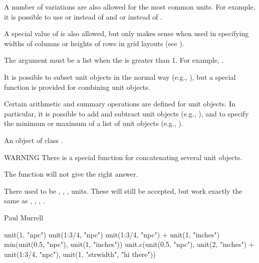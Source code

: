 \begin{Details}
\begin{description}
\end{description}


A number of variations are also allowed for the most common units.
For example, it is possible to use  or 
instead of  and  or
 instead of .

A special  value of  is also allowed,
but only makes sense when used in specifying widths of columns
or heights of rows in grid layouts (see ).

The  argument must be a list when the 
is greater than 1.  For example,
.

It is possible to subset unit objects in the normal way
(e.g., ), but a special function
 is provided for combining unit objects.

Certain arithmetic and summary operations are defined for
unit objects.  In particular, it is possible to add and subtract
unit objects (e.g., ),
and to specify the minimum or maximum of a list
of unit objects (e.g., ).
\end{Details}
%
\begin{Value}
An object of class . 
\end{Value}
%
\begin{Section}{WARNING}
There is a special function  for concatenating
several unit objects.

The  function will not give the right answer.

There used to be , , ,
 units.  These will still be accepted, but
work exactly the same as
, , ,
.
\end{Section}
%
\begin{Author}\relax
Paul Murrell
\end{Author}
%
\begin{SeeAlso}\relax
{}
\end{SeeAlso}
%
\begin{Examples}
\begin{ExampleCode}
unit(1, "npc")
unit(1:3/4, "npc")
unit(1:3/4, "npc") + unit(1, "inches")
min(unit(0.5, "npc"), unit(1, "inches"))
unit.c(unit(0.5, "npc"), unit(2, "inches") + unit(1:3/4, "npc"),
       unit(1, "strwidth", "hi there"))
\end{ExampleCode}
\end{Examples}
